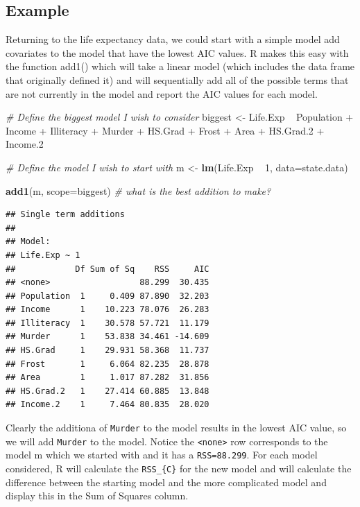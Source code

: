 \documentclass[]{book}
\newenvironment{Shaded}{\begin{snugshade}}{\end{snugshade}}
\newcommand{\KeywordTok}[1]{\textcolor[rgb]{0.13,0.29,0.53}{\textbf{{#1}}}}
\newcommand{\DataTypeTok}[1]{\textcolor[rgb]{0.13,0.29,0.53}{{#1}}}
\newcommand{\DecValTok}[1]{\textcolor[rgb]{0.00,0.00,0.81}{{#1}}}
\newcommand{\FloatTok}[1]{\textcolor[rgb]{0.00,0.00,0.81}{{#1}}}
\newcommand{\StringTok}[1]{\textcolor[rgb]{0.31,0.60,0.02}{{#1}}}
\newcommand{\CommentTok}[1]{\textcolor[rgb]{0.56,0.35,0.01}{\textit{{#1}}}}
\newcommand{\NormalTok}[1]{{#1}}
\theoremstyle{definition}
\theoremstyle{definition}
\theoremstyle{remark}
\begin{document}
\subsection{Example}\label{example}

Returning to the life expectancy data, we could start with a simple
model add covariates to the model that have the lowest AIC values. R
makes this easy with the function add1() which will take a linear model
(which includes the data frame that originally defined it) and will
sequentially add all of the possible terms that are not currently in the
model and report the AIC values for each model.

\begin{Shaded}
\begin{Highlighting}[]
\CommentTok{# Define the biggest model I wish to consider}
\NormalTok{biggest <-}\StringTok{ }\NormalTok{Life.Exp ~}\StringTok{ }\NormalTok{Population +}\StringTok{ }\NormalTok{Income +}\StringTok{ }\NormalTok{Illiteracy +}\StringTok{ }\NormalTok{Murder +}\StringTok{ }
\StringTok{                      }\NormalTok{HS.Grad +}\StringTok{ }\NormalTok{Frost +}\StringTok{ }\NormalTok{Area +}\StringTok{ }\NormalTok{HS.Grad}\FloatTok{.2} \NormalTok{+}\StringTok{ }\NormalTok{Income}\FloatTok{.2}

\CommentTok{# Define the model I wish to start with}
\NormalTok{m <-}\StringTok{ }\KeywordTok{lm}\NormalTok{(Life.Exp ~}\StringTok{ }\DecValTok{1}\NormalTok{, }\DataTypeTok{data=}\NormalTok{state.data)}

\KeywordTok{add1}\NormalTok{(m, }\DataTypeTok{scope=}\NormalTok{biggest)  }\CommentTok{# what is the best addition to make?}
\end{Highlighting}
\end{Shaded}

\begin{verbatim}
## Single term additions
## 
## Model:
## Life.Exp ~ 1
##            Df Sum of Sq    RSS     AIC
## <none>                  88.299  30.435
## Population  1     0.409 87.890  32.203
## Income      1    10.223 78.076  26.283
## Illiteracy  1    30.578 57.721  11.179
## Murder      1    53.838 34.461 -14.609
## HS.Grad     1    29.931 58.368  11.737
## Frost       1     6.064 82.235  28.878
## Area        1     1.017 87.282  31.856
## HS.Grad.2   1    27.414 60.885  13.848
## Income.2    1     7.464 80.835  28.020
\end{verbatim}

Clearly the additiona of \texttt{Murder} to the model results in the
lowest AIC value, so we will add \texttt{Murder} to the model. Notice
the \texttt{\textless{}none\textgreater{}} row corresponds to the model
m which we started with and it has a \texttt{RSS=88.299}. For each model
considered, R will calculate the \texttt{RSS\_\{C\}} for the new model
and will calculate the difference between the starting model and the
more complicated model and display this in the Sum of Squares column.
\end{document}
